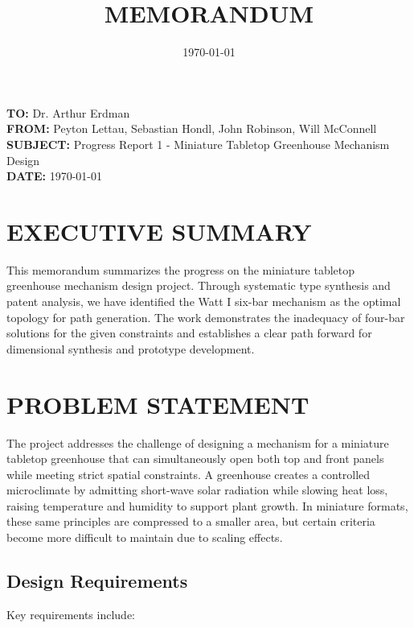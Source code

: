 \documentclass[12pt]{article}
\title{\textbf{MEMORANDUM}}
\author{}
\date{\today}
\begin{document}
\maketitle

\vspace{-1cm}
\begin{center}
\textbf{TO:} Dr. Arthur Erdman \\
\textbf{FROM:} Peyton Lettau, Sebastian Hondl, John Robinson, Will McConnell \\
\textbf{SUBJECT:} Progress Report 1 - Miniature Tabletop Greenhouse Mechanism Design \\
\textbf{DATE:} \today
\end{center}

\vspace{0.5cm}

\section*{EXECUTIVE SUMMARY}

This memorandum summarizes the progress on the miniature tabletop greenhouse mechanism design project. Through systematic type synthesis and patent analysis, we have identified the Watt I six-bar mechanism as the optimal topology for path generation. The work demonstrates the inadequacy of four-bar solutions for the given constraints and establishes a clear path forward for dimensional synthesis and prototype development.

\section*{PROBLEM STATEMENT}

The project addresses the challenge of designing a mechanism for a miniature tabletop greenhouse that can simultaneously open both top and front panels while meeting strict spatial constraints. A greenhouse creates a controlled microclimate by admitting short-wave solar radiation while slowing heat loss, raising temperature and humidity to support plant growth. In miniature formats, these same principles are compressed to a smaller area, but certain criteria become more difficult to maintain due to scaling effects.

\subsection*{Design Requirements}
Key requirements include:
\end{document}
